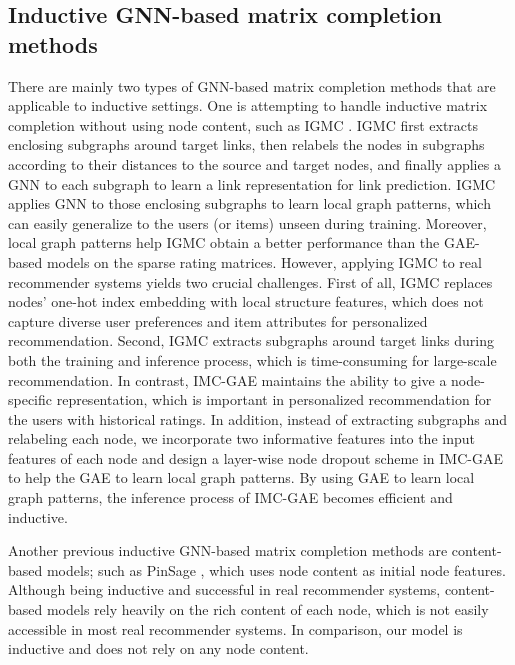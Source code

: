 \documentclass[sigconf]{acmart}
\begin{document}
\subsection{Inductive GNN-based matrix completion methods}
There are mainly two types of GNN-based matrix completion methods that are applicable to inductive settings. One is attempting to handle inductive matrix completion without using node content, such as IGMC \cite{zhang2019inductive}. IGMC first extracts enclosing subgraphs around target links, then relabels the nodes in subgraphs according to their distances to the source and target nodes, and finally applies a GNN to each subgraph to learn a link representation for link prediction. IGMC applies GNN to those enclosing subgraphs to learn local graph patterns, which can easily generalize to the users (or items) unseen during training. Moreover, local graph patterns help IGMC obtain a better performance than the GAE-based models on the sparse rating matrices. However, applying IGMC to real recommender systems yields two crucial challenges. First of all,  IGMC replaces nodes' one-hot index embedding with local structure features, which does not capture diverse user preferences and item attributes for personalized recommendation. Second, IGMC extracts subgraphs around target links during both the training and inference process, which is time-consuming for large-scale recommendation. In contrast, IMC-GAE maintains the ability to give a node-specific representation, which is important in personalized recommendation for the users with historical ratings. In addition, instead of extracting subgraphs and relabeling each node, we incorporate two informative features into the input features of each node and design a layer-wise node dropout scheme in IMC-GAE to help the GAE to learn local graph patterns. By using GAE to learn local graph patterns, the inference process of IMC-GAE becomes efficient and inductive.

Another previous inductive GNN-based matrix completion methods are content-based models; such as PinSage \cite{ying2018graph}, which uses node content as initial node features. Although being inductive and successful in real recommender systems, content-based models rely heavily on the rich content of each node, which is not easily accessible in most real recommender systems. In comparison, our model is inductive and does not rely on any node content.
\end{document}
